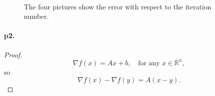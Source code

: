 \documentclass[12pt,a4paper]{article}
\begin{document}
	\begin{figure}
		\centering
		\\
		
		
		\caption{ The four pictures show the error with respect to the iteration number.} %
		\label{img2}
	\end{figure}
	
	\paragraph{p2.}
	\begin{proof}
		\begin{equation*}
			\nabla f(x)= Ax+b, \quad \text{for any }x \in\mathbb{R}^n,
		\end{equation*}
	so 
	$$
	\nabla f(x)-\nabla f(y)=A(x-y).
	$$
	\end{proof}
	
	
\end{document}
